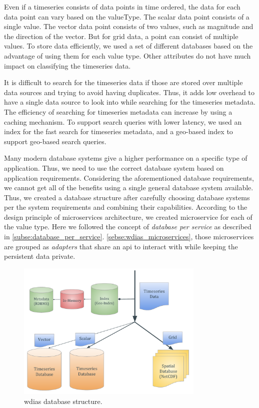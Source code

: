 Even if a timeseries consists of data points in time ordered, the data for each data point can vary based on the valueType. The scalar data point consists of a single value. The vector data point consists of two values, such as magnitude and the direction of the vector. But for grid data, a point can consist of multiple values. To store data efficiently, we used a set of different databases based on the advantage of using them for each value type. Other attributes do not have much impact on classifying the timeseries data.

It is difficult to search for the timeseries data if those are stored over multiple data sources and trying to avoid having duplicates. Thus, it adds low overhead to have a single data source to look into while searching for the timeseries metadata. The efficiency of searching for timeseries metadata can increase by using a caching mechanism. To support search queries with lower latency, we used an index for the fast search for timeseries metadata, and a geo-based index to support geo-based search queries.

Many modern database systems give a higher performance on a specific type of application. Thus, we need to use the correct database system based on application requirements. Considering the aforementioned database requirements, we cannot get all of the benefits using a single general database system available. Thus, we created a database structure after carefully choosing database systems per the system requirements and combining their capabilities. According to the design principle of microservices architecture, we created microservice for each of the value type. Here we followed the concept of \emph{database per service} as described in \cref{subse:database_per_service}. \cref{sebse:wdias_microservices}, those microservices are grouped as \emph{adapters} that share an \acrshort{api} to interact with while keeping the persistent data private.

\begin{figure}[htp]
    \centering
    \includegraphics[width=0.8\textwidth]{method/microservice/wdias_database_structure.pdf}
    \caption{\acrshort{wdias} database structure.}
    \label{fi:database_structure}
\end{figure}


